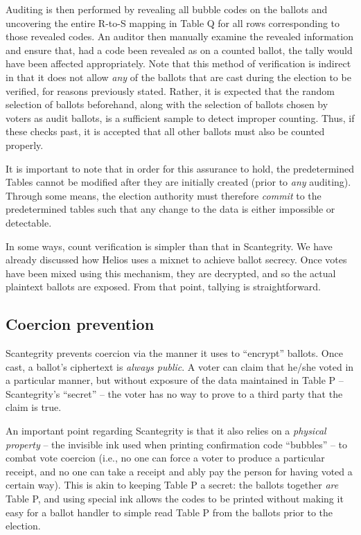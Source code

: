 \documentclass[10pt]{article}
\newcommand{\term}[1]{\textit{#1}}
\begin{document}
\begin{multicols}{2}
Auditing is then performed by revealing all bubble codes on the ballots and uncovering the entire
R-to-S mapping in Table Q for all rows corresponding to those revealed codes. An auditor then
manually examine the revealed information and ensure that, had a code been revealed as on a counted
ballot, the tally would have been affected appropriately. Note that this method of verification is
indirect in that it does not allow \emph{any} of the ballots that are cast during the election to be
verified, for reasons previously stated. Rather, it is expected that the random selection of ballots
beforehand, along with the selection of ballots chosen by voters as audit ballots, is a sufficient
sample to detect improper counting. Thus, if these checks past, it is accepted that all other
ballots must also be counted properly.

It is important to note that in order for this assurance to hold, the predetermined Tables cannot be
modified after they are initially created (prior to \emph{any} auditing). Through some means, the
election authority must therefore \term{commit} to the predetermined tables such that any change to
the data is either impossible or detectable.

In some ways, count verification is simpler than that in Scantegrity. We have already discussed how
Helios uses a mixnet to achieve ballot secrecy. Once votes have been mixed using this mechanism,
they are decrypted, and so the actual plaintext ballots are exposed. From that point, tallying is
straightforward.

\subsection{Coercion prevention}

Scantegrity prevents coercion via the manner it uses to ``encrypt'' ballots. Once cast, a ballot's
ciphertext is \emph{always public}. A voter can claim that he/she voted in a particular manner, but
without exposure of the data maintained in Table P -- Scantegrity's ``secret'' -- the voter has no
way to prove to a third party that the claim is true.

An important point regarding Scantegrity is that it also relies on a \emph{physical property} -- the
invisible ink used when printing confirmation code ``bubbles'' -- to combat vote coercion (i.e., no
one can force a voter to produce a particular receipt, and no one can take a receipt and ably pay
the person for having voted a certain way). This is akin to keeping Table P a secret: the ballots
together \emph{are} Table P, and using special ink allows the codes to be printed without making it
easy for a ballot handler to simple read Table P from the ballots prior to the election.


\end{multicols}
\end{document}
